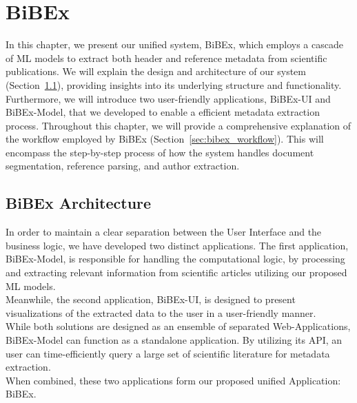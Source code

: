 \chapter{BiBEx}\label{chap:bibex}

In this chapter, we present our unified system, BiBEx, which employs a cascade of ML models to extract both header and reference metadata from scientific publications. We will explain the design and architecture of our system (Section~\ref{sec:bibex_architecture}), providing insights into its underlying structure and functionality. Furthermore, we will introduce two user-friendly applications, BiBEx-UI and BiBEx-Model, that we developed to enable a efficient metadata extraction process.
Throughout this chapter, we will provide a comprehensive explanation of the workflow employed by BiBEx (Section~\ref{sec:bibex_workflow}). This will encompass the step-by-step process of how the system handles document segmentation, reference parsing, and author extraction.


\section{BiBEx Architecture}\label{sec:bibex_architecture}
In order to maintain a clear separation between the User Interface and the business logic, we have developed two distinct applications. The first application, BiBEx-Model, is responsible for handling the computational logic, by processing and extracting relevant information from scientific articles utilizing our proposed ML models.\\
Meanwhile, the second application, BiBEx-UI, is designed to present visualizations of the extracted data to the user in a user-friendly manner.\\
While both solutions are designed as an ensemble of separated Web-Applications, BiBEx-Model can function as a standalone application. By utilizing its API, an user can time-efficiently query a large set of scientific literature for metadata extraction.\\
When combined, these two applications form our proposed unified Application: BiBEx.

